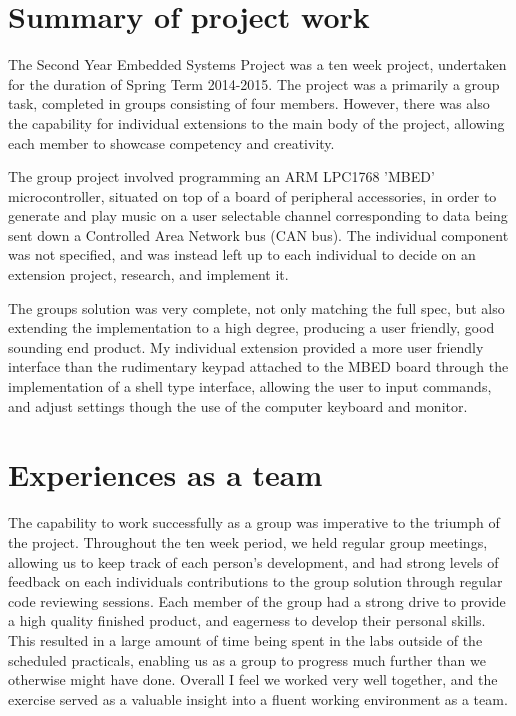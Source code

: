 \section{Summary of project work}
The Second Year Embedded Systems Project was a ten week project, undertaken 
for the duration of Spring Term 2014-2015. The project was a primarily a 
group task, completed in groups consisting of four members. However, there 
was also the capability for individual extensions to the main body of the 
project, allowing each member to showcase competency and creativity.

The group project involved programming an ARM LPC1768 'MBED' microcontroller, 
situated on top of a board of peripheral accessories, in order to 
generate and play music on a user selectable channel corresponding to data 
being sent down a Controlled Area Network bus (CAN bus). The individual 
component was not specified, and was instead left up to each individual to 
decide on an extension project, research, and implement it. 

The groups solution was very complete, not only matching the full spec, but also
extending the implementation to a high degree, producing a user friendly, good 
sounding end product. My individual extension provided a more user friendly interface than the 
rudimentary keypad attached to the MBED board through the implementation of a 
shell type interface, allowing the user to input commands, and adjust settings
though the use of the computer keyboard and monitor. 
 
\section{Experiences as a team}
The capability to work successfully as a group was imperative to the triumph of
the project. Throughout the ten week period, we held regular group meetings, 
allowing us to keep track of each person's development, and had strong levels 
of feedback on each individuals contributions to the group solution through 
regular code reviewing sessions. Each member of the group had a strong drive to 
provide a high quality finished product, and eagerness to develop their 
personal skills. This resulted in a large amount of time being spent in the 
labs outside of the scheduled practicals, enabling us as a group to progress 
much further than we otherwise might have done. Overall I feel we worked very 
well together, and the exercise served as a valuable insight into a fluent 
working environment as a team. 

